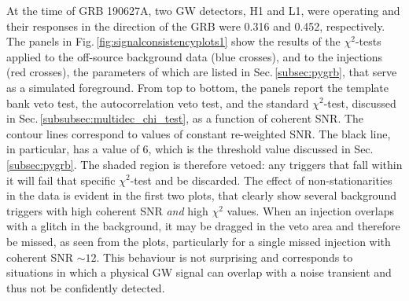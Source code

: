 \documentclass[binding=0.6cm, LaM]{sapthesis}
\begin{document}
	At the time of GRB 190627A, two GW detectors, H1 and L1, 
	were operating and their responses in the direction of the GRB were 0.316 and 0.452, respectively.
	The panels in Fig.\,\ref{fig:signalconsistencyplots1} show the results 
	of the $\chi^2$-tests applied to the off-source background data (blue crosses), and to the injections (red crosses),
	the parameters of which are listed in Sec.\,\ref{subsec:pygrb}, that serve as a simulated foreground. 
	From top to bottom, the panels report the template bank veto test, 
	the autocorrelation veto test, and the standard $\chi^2$-test, 
	discussed in Sec.\,\ref{subsubsec:multidec_chi_test}, as a function of coherent SNR. 
	The contour lines correspond to values of constant re-weighted SNR.
	The black line, in particular, has a value of 6, 
	which is the threshold value discussed in Sec.\,\ref{subsec:pygrb}.
	The shaded region is therefore vetoed: any triggers that fall within it 
	will fail that specific $\chi^2$-test and be discarded.
	The effect of non-stationarities in the data is evident in the first two plots, 
	that clearly show several background triggers with high coherent SNR \emph{and} high $\chi^2$ values.
	When an injection overlaps with a glitch in the background, 
	it may be dragged in the veto area and therefore be missed, as seen from the plots, 	
	particularly for a single missed injection with coherent SNR $\sim 12$.
	This behaviour is not surprising and corresponds to situations in which a physical GW signal 
	can overlap with a noise transient and thus not be confidently detected.
\end{document}
